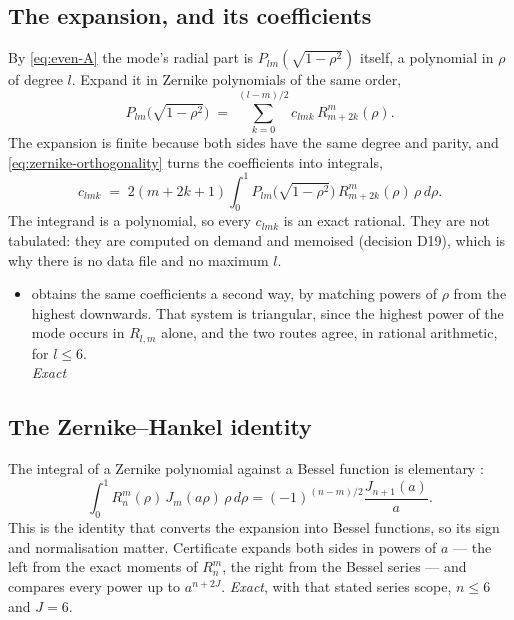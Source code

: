 \subsection{The expansion, and its coefficients}
\label{sec:even-projection}

By \eqref{eq:even-A} the mode's radial part is $P_{lm}(\sqrt{1-\rho^2})$ itself, a
polynomial in $\rho$ of degree $l$.  Expand it in Zernike polynomials of the same order,
\begin{equation}
  P_{lm}\bigl(\sqrt{1-\rho^{2}}\bigr) \;=\; \sum_{k=0}^{(l-m)/2} c_{lmk}\, R_{m+2k}^m(\rho) .
  \label{eq:even-expansion}
\end{equation}
The expansion is finite because both sides have the same degree and parity, and
\eqref{eq:zernike-orthogonality} turns the coefficients into integrals,
\begin{equation}
  c_{lmk} \;=\; 2(m+2k+1) \int_0^1 P_{lm}\bigl(\sqrt{1-\rho^{2}}\bigr)\,
  R_{m+2k}^m(\rho)\, \rho\, d\rho .
  \label{eq:even-coefficients}
\end{equation}
The integrand is a polynomial, so every $c_{lmk}$ is an exact rational.  They are not
tabulated: they are computed on demand and memoised (decision D19), which is why
there is no data file and no maximum $l$.

\begin{itemize}
  \item[$\checkmark$]  obtains the same coefficients a second
    way, by matching powers of $\rho$ from the highest downwards.  That system is triangular,
    since the highest power of the mode occurs in $R_{l,m}$ alone, and the two routes agree,
    in rational arithmetic, for $l \le 6$.
    \\[1pt] \quad \emph{Exact}
\end{itemize}

\subsection{The Zernike--Hankel identity}
\label{sec:zernike-hankel}

The integral of a Zernike polynomial against a Bessel function is elementary
\citep{zernike1934,bornwolf}:
\begin{equation}
  \int_0^1 R_n^m(\rho)\, J_m(a\rho)\, \rho\, d\rho
  = (-1)^{(n-m)/2} \frac{J_{n+1}(a)}{a} .
  \label{eq:zernike-hankel}
\end{equation}
This is the identity that converts the expansion into Bessel functions, so its sign
and normalisation matter.  Certificate  expands both sides in powers of $a$
--- the left from the exact moments of $R_n^m$, the right from the Bessel series ---
and compares every power up to $a^{n+2J}$.  \emph{Exact}, with that stated series
scope, $n \le 6$ and $J = 6$.

